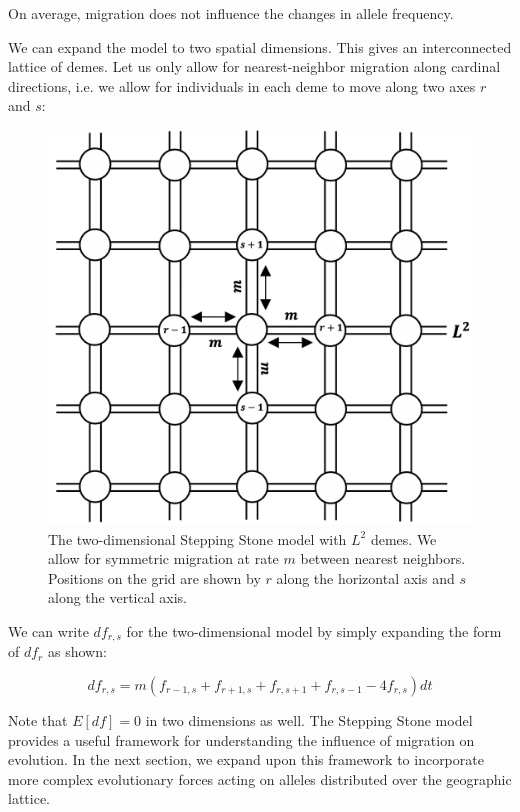 On average, migration does not influence the changes in allele frequency. 


We can expand the model to two spatial dimensions. This gives an interconnected lattice of demes. Let us only allow for nearest-neighbor migration along cardinal directions, i.e. we allow for individuals in each deme to move along two axes $r$ and $s$:

\begin{figure}[h]
    \centering
    \includegraphics[scale = 0.3]{img/2d_ss.png}
    \caption{The two-dimensional Stepping Stone model with $L^2$ demes. We allow for symmetric migration at rate $m$ between nearest neighbors. Positions on the grid are shown by $r$ along the horizontal axis and $s$ along the vertical axis.}
    \label{fig:2d_ss}
\end{figure}


We can write $df_{r,s}$ for the two-dimensional model by simply expanding the form of $df_r$ as shown:


\begin{equation} \label{eq:stepstone}
    df_{r,s} = m(f_{r-1,s} + f_{r+1,s} + f_{r,s+1} + f_{r,s-1} - 4f_{r,s})dt
\end{equation}


Note that $E[df] = 0$ in two dimensions as well. The Stepping Stone model provides a useful framework for understanding the influence of migration on evolution. In the next section, we expand upon this framework to incorporate more complex evolutionary forces acting on alleles distributed over the geographic lattice.  



